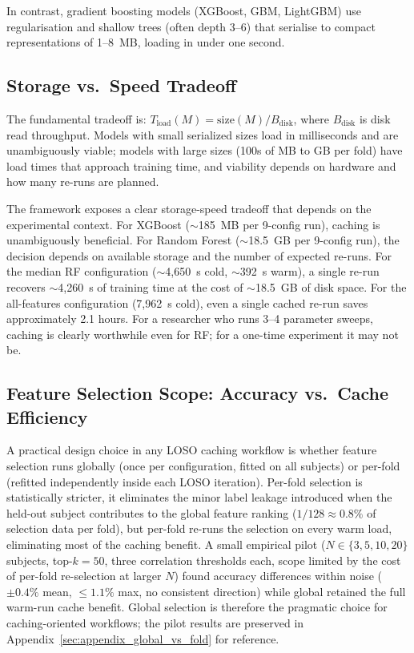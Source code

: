 In contrast, gradient boosting models (XGBoost, GBM, LightGBM) use
regularisation and shallow trees (often depth 3--6) that serialise to compact
representations of 1--8~MB, loading in under one second.

\subsection{Storage vs.\ Speed Tradeoff}

The fundamental tradeoff is: $T_{\text{load}}(M) = \text{size}(M) / B_{\text{disk}}$,
where $B_{\text{disk}}$ is disk read throughput. Models with small serialized sizes
load in milliseconds and are unambiguously viable; models with large sizes
(100s of MB to GB per fold) have load times that approach training time, and viability
depends on hardware and how many re-runs are planned.

The framework exposes a clear storage-speed tradeoff that depends on the
experimental context. For XGBoost ($\sim$185~MB per 9-config run), caching
is unambiguously beneficial. For Random Forest ($\sim$18.5~GB per 9-config
run), the decision depends on available storage and the number of expected
re-runs. For the median RF configuration ($\sim$4{,}650~s cold, $\sim$392~s warm),
a single re-run recovers $\sim$4{,}260~s of training time at the cost of
$\sim$18.5~GB of disk space. For the all-features configuration (7{,}962~s cold),
even a single cached re-run saves approximately 2.1 hours. For a researcher
who runs 3--4 parameter sweeps, caching is clearly worthwhile even for RF;
for a one-time experiment it may not be.

\subsection{Feature Selection Scope: Accuracy vs.\ Cache Efficiency}
\label{sec:discussion_scope}

A practical design choice in any LOSO caching workflow is whether feature
selection runs globally (once per configuration, fitted on all subjects) or
per-fold (refitted independently inside each LOSO iteration). Per-fold
selection is statistically stricter, it eliminates the minor label leakage
introduced when the held-out subject contributes to the global feature
ranking ($1/128 \approx 0.8\%$ of selection data per fold), but per-fold
re-runs the selection on every warm load, eliminating most of the caching
benefit. A small empirical pilot ($N \in \{3,5,10,20\}$ subjects, top-$k=50$,
three correlation thresholds each, scope limited by the cost of per-fold
re-selection at larger $N$) found accuracy differences within noise
($\pm 0.4\%$ mean, $\leq 1.1\%$ max, no consistent direction) while global
retained the full warm-run cache benefit. Global selection is therefore the
pragmatic choice for caching-oriented workflows; the pilot results are
preserved in Appendix~\ref{sec:appendix_global_vs_fold} for reference.

